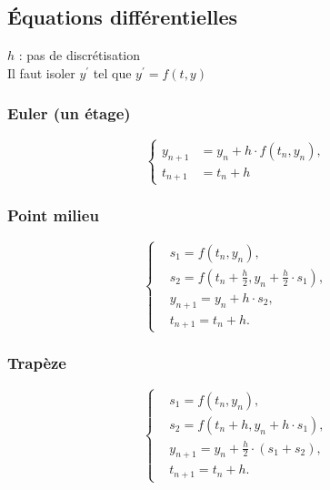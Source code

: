 \subsection*{Équations différentielles}
\noindent
$h$ : pas de discrétisation\\
Il faut isoler $y^{\prime}$ tel que $y^{\prime}=f(t,y)$
\subsubsection*{Euler (un étage)}
\noindent
\begin{equation}
    \left\{
    \begin{aligned}
        y_{n+1} & = y_n + h\cdot f(t_n, y_n), \\
        t_{n+1} & = t_n + h
    \end{aligned}
    \right.
    \nonumber
\end{equation}
\subsubsection*{Point milieu}
\noindent
\begin{equation}
    \left\{
    \begin{aligned}
         & s_1     = f(t_n,y_n),                                             \\
         & s_2     = f\left(t_n+\frac{h}{2},y_n+\frac{h}{2}\cdot s_1\right), \\
         & y_{n+1} = y_n+h\cdot s_2,                                         \\
         & t_{n+1} = t_n+h.
    \end{aligned}
    \right.
    \nonumber
\end{equation}
\subsubsection*{Trapèze}
\noindent
\begin{equation}
    \left\{
    \begin{aligned}
         & s_1     = f(t_n,y_n),                         \\
         & s_2     = f\left(t_n+h,y_n+h\cdot s_1\right), \\
         & y_{n+1} = y_n+\frac{h}{2}\cdot(s_1+s_2),      \\
         & t_{n+1} = t_n+h.
    \end{aligned}
    \right.
    \nonumber
\end{equation}
